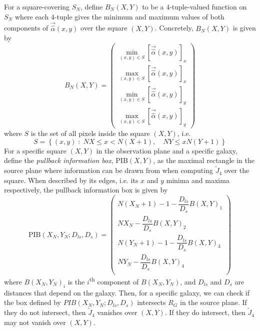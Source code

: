 \documentclass[10pt,twoside]{article}
\theoremstyle{definition}
\theoremstyle{exercise}
\newcommand{\setc}[2]{\left\{#1\; :\; #2 \right\}}%
\begin{document}
For a square-covering $S_N$, define $B_N(X, Y)$ to be a 4-tuple-valued function on $S_N$ where each 4-tuple gives the minimum and maximum values of both components of $\vec{\hat{\alpha}}(x,y)$ over the square $(X,Y)$. Concretely, $B_N(X,Y)$ is given by
\begin{equation}
  B_N(X,Y) = \begin{pmatrix}
    \displaystyle\min_{(x,y) \in S}\left[\vec{\hat{\alpha}}(x,y)\right]_x \\
    \displaystyle\max_{(x,y) \in S}\left[\vec{\hat{\alpha}}(x,y)\right]_x \\
    \displaystyle\min_{(x,y) \in S}\left[\vec{\hat{\alpha}}(x,y)\right]_y \\
    \displaystyle\max_{(x,y) \in S}\left[\vec{\hat{\alpha}}(x,y)\right]_y
  \end{pmatrix}
  \label{eq:alpha_box}
\end{equation}
where $S$ is the set of all pixels inside the square $(X,Y)$, i.e.
\begin{equation}
  S = \setc{(x,y)}{NX \le x < N(X+1),\quad NY\le x N(Y+1)}
  \label{eq:pix_in_sqaure}
\end{equation}
For a specific square $(X,Y)$ in the observation plane and a specific galaxy, define the \textit{pullback information box}, $\text{PIB}(X,Y)$, as the maximal rectangle in the source plane where information can be drawn from when computing $\tilde{J}_4$ over the square. When described by its edges, i.e. its $x$ and $y$ minima and maxima respectively, the pullback information box is given by
\begin{equation}
  \text{PIB}(X_N,Y_N; D_{ls}, D_{s}) = \begin{pmatrix}
    N(X_N+1)-1-\dfrac{D_{ls}}{D_s}B(X,Y)_1\\
    NX_N-\dfrac{D_{ls}}{D_s}B(X,Y)_2\\
    N(Y_N+1)-1-\dfrac{D_{ls}}{D_s}B(X,Y)_3\\
    NY_N-\dfrac{D_{ls}}{D_s}B(X,Y)_4\\
  \end{pmatrix}
  \label{eq:pullback_square_infobox}
\end{equation}
where $B(X_N,Y_N)_i$ is the $i$\textsuperscript{th} component of $B(X_N,Y_N)$, and $D_{ls}$ and $D_{s}$ are distances that depend on the galaxy. Then, for a specific galaxy, we can check if the box defined by $PIB(X_N,Y_N; D_{ls}, D_s)$ intersects $R_G$ in the source plane. If they do not intersect, then $\tilde{J}_4$ vanishes over $(X,Y)$. If they do intersect, then $\tilde{J}_4$ may not vanish over $(X,Y)$.
\end{document}
